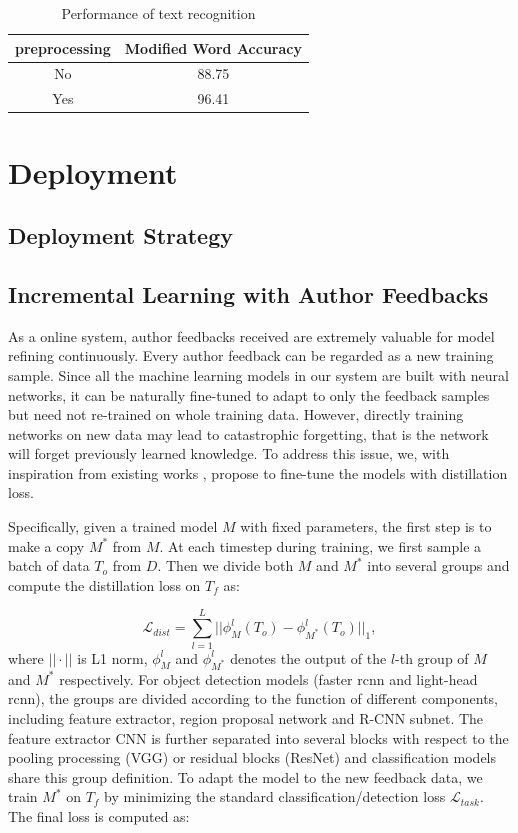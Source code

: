 \documentclass[sigconf]{acmart}
\begin{document}
\begin{table}
	\caption{Performance of text recognition}
	\label{text_recognition}
	\centering
	\begin{tabular}{cc}
	\toprule
	\textbf{preprocessing} & \textbf{Modified Word Accuracy} \\
	\midrule
	No & 88.75 \\
	Yes & 96.41 \\
	\bottomrule
	\end{tabular}
\end{table}


\section{Deployment}
\subsection{Deployment Strategy}

\subsection{Incremental Learning with Author Feedbacks}
As a online system, author feedbacks received are extremely valuable for model refining continuously. Every author feedback can be regarded as a new training sample. Since all the machine learning models in our system are built with neural networks, it can be naturally fine-tuned to adapt to only the feedback samples but need not re-trained on whole training data. However, directly training networks on new data may lead to catastrophic forgetting, that is the network will forget previously learned knowledge. To address this issue, we, with inspiration from existing works \cite{shmelkov2017incremental, yuan2018text}, propose to fine-tune the models with distillation loss.

Specifically, given a trained model $M$ with fixed parameters, the first step is to make a copy $M^{*}$ from $M$. At each timestep during training, we first sample a batch of data $T_{o}$ from $D$. Then we divide both $M$ and $M^{*}$ into several groups and compute the distillation loss on $T_{f}$ as:

\begin{equation}
\label{eqn_dist}
	\mathcal{L}_{dist} = \sum_{l=1}^{L}||\phi_{M}^{l}(T_{o})-\phi_{M^{*}}^{l}(T_{o}) ||_{1},
\end{equation}
where $||\cdot||$ is L1 norm, $\phi_{M}^{l}$ and $\phi_{M^{*}}^{l}$ denotes the output of the $l$-th group of $M$ and $M^{*}$ respectively. For object detection models (faster rcnn and light-head rcnn), the groups are divided according to the function of different components, including feature extractor, region proposal network and R-CNN subnet. The feature extractor CNN is further separated into several blocks with respect to the pooling processing (VGG) or residual blocks (ResNet) and classification models share this group definition. To adapt the model to the new feedback data, we train $M^{*}$ on $T_{f}$ by minimizing the standard classification/detection loss $\mathcal{L}_{task}$. The final loss is computed as:
\end{document}
